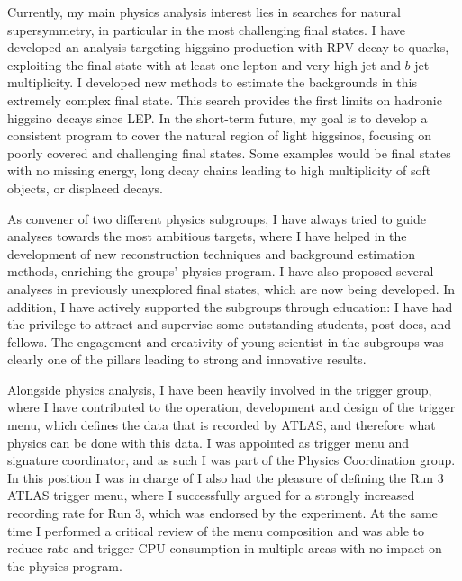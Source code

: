 \documentclass[11pt,a4paper,sans]{moderncv}        %
\begin{document}
Currently, my main physics analysis interest lies in searches for natural supersymmetry, in particular in the most challenging final states. 
I have developed an analysis targeting higgsino production with RPV decay to quarks, exploiting the final state with at least one lepton and very high jet and $b$-jet multiplicity. I developed new methods to estimate the backgrounds in this extremely complex final state. This search provides the first limits on hadronic higgsino decays since LEP. 
In the short-term future, my goal is to develop a consistent program to cover the natural region of light higgsinos, focusing on poorly covered and challenging final states. Some examples would be final states with no missing energy, long decay chains leading to high multiplicity of soft objects, or displaced decays. 
\newline

As convener of two different physics subgroups, I have always tried to guide analyses towards the most ambitious targets, where I have helped in the development of new reconstruction techniques and background estimation methods, enriching the groups' physics program.
I have also proposed several analyses in previously unexplored final states, which are now being developed. In addition, I have actively supported the subgroups through education: I have had the privilege to attract and supervise some outstanding students, post-docs, and fellows. The engagement and creativity of young scientist in the subgroups was clearly one of the pillars leading to strong and innovative results.
\newline


Alongside physics analysis, I have been heavily involved in the trigger group, where I have contributed to the operation, development and design of the trigger menu, which defines the data that is recorded by ATLAS, and therefore what physics can be done with this data. I was appointed as trigger menu and signature coordinator, and as such I was part of the Physics Coordination group. In this position I was in charge of 
I also had the pleasure of defining the Run 3 ATLAS trigger menu, where I successfully argued for a strongly increased recording rate for Run 3, which was endorsed by the experiment. At the same time I performed a critical review of the menu composition and was able to reduce rate and trigger CPU consumption in multiple areas with no impact on the physics program.
\newline
\end{document}
